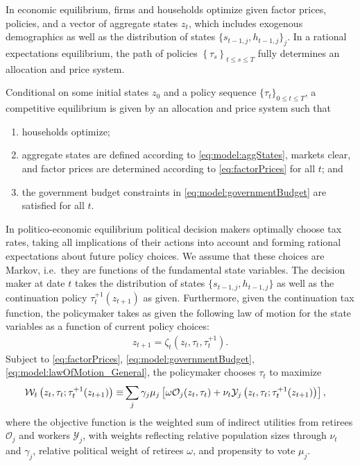 In economic equilibrium, firms and households optimize given factor prices, policies, and a vector of aggregate states $z_t$, which includes exogenous demographics as well as the distribution of states $\lbrace s_{t-1,j}, h_{t-1,j}\rbrace_j$. In a rational expectations equilibrium, the path of policies $\left\lbrace \tau_s\right\rbrace_{t\leq s \leq T}$ fully determines an allocation and price system. 

Conditional on some initial states $z_0$ and a policy sequence $\lbrace \tau_t\rbrace_{0\leq t\leq T}$, a competitive equilibrium is given by an allocation and price system such that
\begin{enumerate}
    \item households optimize;
    \item aggregate states are defined according to \eqref{eq:model:aggStates}, markets clear, and factor prices are determined according to \eqref{eq:factorPrices} for all $t$; and
    \item the government budget constraints in \eqref{eq:model:governmentBudget} are satisfied for all $t$.
\end{enumerate}


In politico-economic equilibrium political decision makers optimally choose tax rates, taking all implications of their actions into account and forming rational expectations about future policy choices. We assume that these choices are Markov, i.e.\ they are functions of the fundamental state variables. The decision maker at date $t$ takes the distribution of states $\lbrace s_{t-1,j}, h_{t-1,j} \rbrace$ as well as the continuation policy $\tau^{+1}_t(z_{t+1})$ as given. Furthermore, given the continuation tax function, the policymaker takes as given the following law of motion for the state variables as a function of current policy choices:
\begin{align}\label{eq:model:lawOfMotion_General}
    z_{t+1} = \zeta_t\left(z_t, \tau_t, \tau_t^{+1}\right).
\end{align}
Subject to \eqref{eq:factorPrices}, \eqref{eq:model:governmentBudget}, \eqref{eq:model:lawOfMotion_General}, the policymaker chooses $\tau_t$ to maximize 
\begin{align}
    \mathcal{W}_t\left(z_t, \tau_t; \tau_t^{+1}(z_{t+1})\right) \equiv & \sum_{j}\gamma_j \mu_j \left[\omega \mathcal{O}_j(z_t, \tau_t)+\nu_t \mathcal{Y}_j\left(z_t, \tau_t;\tau_t^{+1}(z_{t+1})\right)\right], \notag
\end{align}
where the objective function is the weighted sum of indirect utilities from retirees $\mathcal{O}_j$ and workers $\mathcal{Y}_j$, with weights reflecting relative population sizes through $\nu_t$ and $\gamma_j$, relative political weight of retirees $\omega$, and propensity to vote $\mu_j$.

